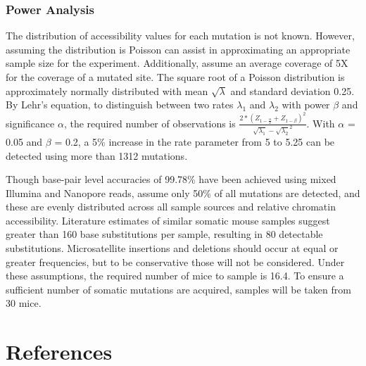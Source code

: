 \subsubsection{Power Analysis}

The distribution of accessibility values for each mutation is not known. However, assuming the distribution is Poisson can assist in approximating an appropriate sample size for the experiment. Additionally, assume an average coverage of 5X for the coverage of a mutated site. The square root of a Poisson distribution is approximately normally distributed with mean $\sqrt{\lambda}$ and standard deviation 0.25.
By Lehr's equation, to distinguish between two rates $\lambda_1$ and $\lambda_2$ with power $\beta$ and significance $\alpha$, the required number of observations is $\frac{2 * (Z_{1 - \frac{\alpha}{2}} + Z_{1 - \beta})^2}{{\sqrt{\lambda_1} - \sqrt{\lambda_2}}^2}$. With $\alpha$ = 0.05 and $\beta$ = 0.2, a 5\% increase in the rate parameter from 5 to 5.25 can be detected using more than 1312 mutations.

Though base-pair level accuracies of 99.78\% have been achieved using mixed Illumina and Nanopore reads, assume only 50\% of all mutations are detected, and these are evenly distributed across all sample sources and relative chromatin accessibility. Literature estimates \parencite{behjati_genome_2014} of similar somatic mouse samples suggest greater than 160 base substitutions per sample, resulting in 80 detectable substitutions. Microsatellite insertions and deletions should occur at equal or greater frequencies, but to be conservative those will not be considered. Under these assumptions, the required number of mice to sample is 16.4. To ensure a sufficient number of somatic mutations are acquired, samples will be taken from 30 mice.

\section{References} %

